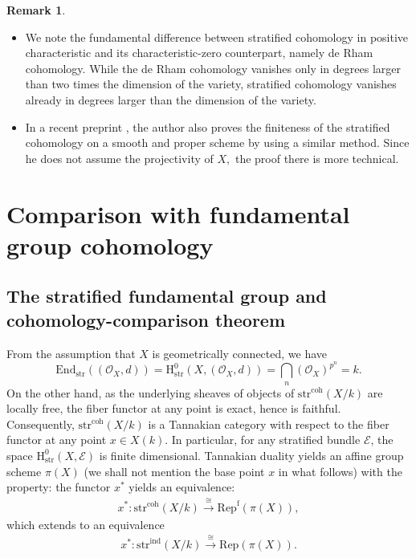 \documentclass[12pt,a4]{amsart}
\theoremstyle{definition}
\newtheorem{rem}[claim]{Remark}
\begin{document}
\begin{rem} 
\begin{itemize}
\item[i)] We note the fundamental difference between stratified cohomology in positive
characteristic and its characteristic-zero counterpart, namely de Rham
cohomology. While the de Rham cohomology vanishes only in degrees larger than two times the 
dimension of the variety, stratified cohomology vanishes already in degrees larger than
the dimension of the variety.
\item[ii)] In a recent preprint \cite{Xia25}, the author also proves the finiteness of the stratified cohomology on a smooth and proper scheme by using a similar method. Since he does not assume the projectivity of $X,$ the proof there is more technical. 
\end{itemize}
 \end{rem}

\section{Comparison with fundamental group cohomology}
\label{sect_comparison}
\subsection{The stratified fundamental group and cohomology-comparison theorem} \label{sect_2.1.4}
From the assumption that $X$ is geometrically connected, we have
$$\mathrm{End}_\text{str}((\mathcal O_X,d)) =
\mathrm{H}_\mathrm{str}^0(X,(\mathcal O_X,d))=\bigcap_n(\mathcal O_X)^{p^n}=k.$$
On the other hand, as the underlying sheaves of objects of 
$\mathrm{str}^\mathrm{coh}(X/k)$ are locally
free, the fiber functor at any point is exact, hence is faithful.
Consequently, $\mathrm{str}^\mathrm{coh}(X/k)$ is a Tannakian category with respect to
the fiber functor at any point $x\in X(k)$. In particular, for any
stratified bundle $\mathcal{E}$, the space
$\mathrm{H}_\mathrm{str}^0(X,\mathcal{E})$ is finite dimensional. 
Tannakian duality yields an affine group scheme $\pi(X)$ (we shall not mention
the base point $x$ in what follows) with the property: the functor $x^*$ yields
an equivalence:
\begin{align}
x^*: \mathrm{str}^\mathrm{coh}(X/k)\stackrel\cong\longrightarrow \mathrm{Rep}^\mathrm{f}(\pi(X)),
\end{align}
which extends to an equivalence
\begin{align}
x^*:  \mathrm{str}^\text{ind}(X/k)\stackrel\cong\longrightarrow \mathrm{Rep}(\pi(X)).
\end{align}
\end{document}
